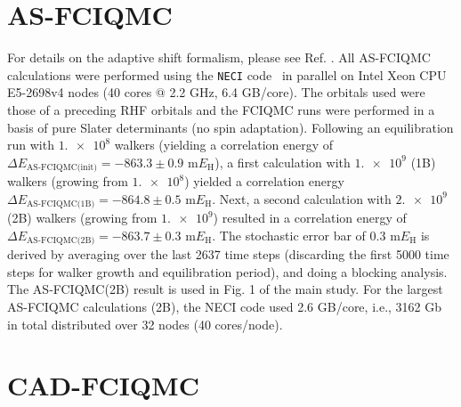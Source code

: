\documentclass[journal=jcp,manuscript=suppinfo]{achemso}
\begin{document}
\section{AS-FCIQMC}\label{as_fciqmc_SI_sect}

For details on the adaptive shift formalism, please see Ref. . All AS-FCIQMC calculations were performed using the {\texttt{NECI}} code~\cite{neci,neci_jcp_2020} in parallel on Intel Xeon CPU E5-2698v4 nodes (40 cores $@$ 2.2 GHz, 6.4 GB/core). The orbitals used were those of a preceding RHF orbitals and the FCIQMC runs were performed in a basis of pure Slater determinants (no spin adaptation). Following an equilibration run with $\num{1.e8}$ walkers (yielding a correlation energy of $\Delta E_{\text{AS-FCIQMC(init)}} = -863.3\pm0.9$ m$E_{\text{H}}$), a first calculation with $\num{1.e9}$ (1B) walkers (growing from $\num{1.e8}$) yielded a correlation energy $\Delta E_{\text{AS-FCIQMC(1B)}} = -864.8\pm0.5$ m$E_{\text{H}}$. Next, a second calculation with $\num{2.e9}$ (2B) walkers (growing from $\num{1.e9}$) resulted in a correlation energy of $\Delta E_{\text{AS-FCIQMC(2B)}} = -863.7\pm0.3$ m$E_{\text{H}}$. The stochastic error bar of $0.3$ m$E_{\text{H}}$ is derived by averaging over the last 2637 time steps (discarding the first 5000 time steps for walker growth and equilibration period), and doing a blocking analysis. The AS‐FCIQMC(2B) result is used in Fig. 1 of the main study. For the largest AS-FCIQMC calculations (2B), the NECI code used 2.6 GB/core, i.e., 3162 Gb in total distributed over 32 nodes (40 cores/node).

\section{CAD-FCIQMC}
\end{document}
